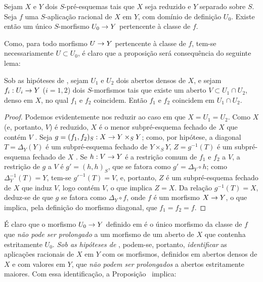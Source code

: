 \documentclass[oneside]{amsart}
\makeatletter
\newcommand{\ega@arrow}[2]{\mathchoice{#1}{#2}{#2}{#2}}
\renewcommand{\to}{\ega@arrow{\longrightarrow}{\rightarrow}}
\newcommand{\oldpage}[2][]{{\marginnote{\normalfont\textbf{#1}~|~#2}}\ignorespaces}
\let\EGAOriginalLabel\label
\renewcommand{\label}[1]{\phantomsection\EGAOriginalLabel{#1}}
\makeatother
\begin{document}
\oldpage[I]{159}
\begin{proposition}[7.2.2]
\label{I.7.2.2}
Sejam $X$ e $Y$ dois $S$-pré-esquemas tais que $X$ seja reduzido e $Y$ separado sobre $S$.
Seja $f$ uma $S$-aplicação racional de $X$ em $Y$, com domínio de definição $U_0$.
Existe então um único $S$-morfismo $U_0\to Y$ pertencente à classe de $f$.
\end{proposition}

Como, para todo morfismo $U\to Y$ pertencente à classe de $f$, tem-se necessariamente $U\subset U_0$, é claro que a proposição será consequência do seguinte lema:

\begin{lemma}[7.2.2.1]
\label{I.7.2.2.1}
Sob as hipóteses de , sejam $U_1$ e $U_2$ dois abertos densos de $X$, e sejam $f_i:U_i\to Y$ ($i=1,2$) dois $S$-morfismos tais que existe um aberto $V\subset U_1\cap U_2$, denso em $X$, no qual $f_1$ e $f_2$ coincidem.
Então $f_1$ e $f_2$ coincidem em $U_1\cap U_2$.
\end{lemma}

\begin{proof}
Podemos evidentemente nos reduzir ao caso em que $X=U_1=U_2$.
Como $X$ (e, portanto, $V$) é reduzido, $X$ é o menor subpré-esquema fechado de $X$ que contém $V$ .
Seja $g=(f_1,f_2)_S:X\to Y\times_S Y$; como, por hipótese, a diagonal $T=\Delta_Y(Y)$ é um subpré-esquema fechado de $Y\times_S Y$, $Z=g^{-1}(T)$ é um subpré-esquema fechado de $X$ .
Se $h:V\to Y$ é a restrição comum de $f_1$ e $f_2$ a $V$, a restrição de $g$ a $V$ é $g'=(h,h)_S$, que se fatora como $g'=\Delta_Y\circ h$; como $\Delta_Y^{-1}(T)=Y$, tem-se $g'^{-1}(T)=V$, e, portanto, $Z$ é um subpré-esquema fechado de $X$ que induz $V$, logo contém $V$, o que implica $Z=X$.
Da relação $g^{-1}(T)=X$, deduz-se de  que $g$ se fatora como $\Delta_Y\circ f$, onde $f$ é um morfismo $X\to Y$, o que implica, pela definição do morfismo diagonal, que $f_1=f_2=f$.
\end{proof}

É claro que o morfismo $U_0\to Y$ definido em  é o único morfismo da classe de $f$ que \emph{não pode ser prolongado} a um morfismo de um aberto de $X$ que contenha estritamente $U_0$.
\emph{Sob as hipóteses de }, podem-se, portanto, \emph{identificar} as aplicações racionais de $X$ em $Y$ com os morfismos, definidos em abertos densos de $X$ e com valores em $Y$, que \emph{não podem ser prolongados} a abertos estritamente maiores.
Com essa identificação, a Proposição~ implica:
\end{document}
